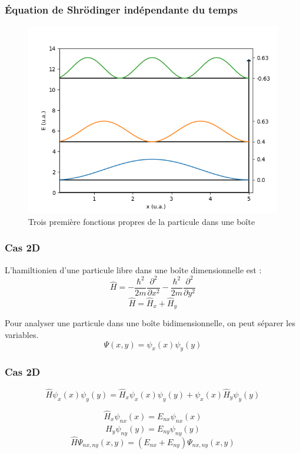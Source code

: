 \documentclass{beamer}
\begin{document}
\begin{frame}
\frametitle{Équation de Shrödinger indépendante du temps}
\begin{figure}[h]
\includegraphics[scale=0.5]{den_propre}
\caption{Trois première fonctions propres de la particule dans une boîte}
\end{figure}

\end{frame}



\begin{frame}
\frametitle{Cas 2D}
L'hamiltionien d'une particule libre dans une boîte dimensionnelle est :
\begin{equation}
\hat{H}=-\frac{\hbar^2}{2m}\frac{\partial^2}{\partial x^2}-\frac{\hbar^2}{2m}\frac{\partial^2}{\partial y^2}
\end{equation}
\begin{equation}
\hat{H}=\hat{H}_x+\hat{H}_y
\end{equation}


Pour analyser une particule dans une boîte bidimensionnelle, on peut séparer les variables. 
\begin{equation}
\Psi(x,y)=\psi_x(x)\psi_y(y)
\end{equation}
\end{frame}


\begin{frame}
\frametitle{Cas 2D}
\begin{equation}
\hat{H}\psi_x(x)\psi_y(y)=\hat{H}_x\psi_x(x)\psi_y(y)+\psi_x(x)\hat{H}_y\psi_y(y)
\end{equation}

\begin{equation}
\hat{H}_x\psi_{nx}(x)=E_{nx}\psi_{nx}(x)
\end{equation}
\begin{equation}
\hat{H}_y\psi_{ny}(y)=E_{ny}\psi_{ny}(y)
\end{equation}
\begin{equation}
\hat{H}\Psi_{nx,ny}(x,y)=\left(E_{nx}+E_{ny}\right)\Psi_{nx,ny}(x,y)
\end{equation}
\end{frame}
\end{document}

